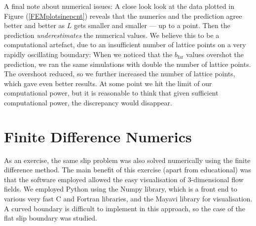 \documentclass[12pt, a4paper, twoside, openright]{book}
\newcommand{\beff}{\ensuremath{b_{\mathrm{eff}}}}
\newcommand{\bfar}{\ensuremath{b_{\mathrm{far}}}}
\begin{document}
A final note about numerical issues:  A close look look at the data plotted in Figure (\ref{FEMplotsinepcnt}) reveals that the numerics and the prediction agree better and better as $L$ gets smaller and smaller --- up to a point.  Then the prediction \emph{underestimates} the numerical values.  We believe this to be a computational artefact, due to an insufficient number of lattice points  on a very rapidly oscillating boundary:  When we noticed that the $\bfar$ values overshot the prediction, we ran the same simulations with double the number of lattice points.  The overshoot reduced, so we further increased the number of lattice points, which gave even better results.  At some point we hit the limit of our computational power, but it is reasonable to think that given sufficient computational power, the discrepancy would disappear.
  









\clearpage
\section{Finite Difference Numerics}

As an exercise, the same slip problem was also solved numerically using the finite difference method.  The main benefit of this exercise (apart from educational) was that the software employed allowed the easy visualisation of 3-dimensional flow fields.  We employed Python using the Numpy library, which is a front end to various very fast C and Fortran libraries, and the Mayavi library for visualisation.  A curved boundary is difficult to implement in this approach, so the case of the flat slip boundary was studied.
\end{document}
